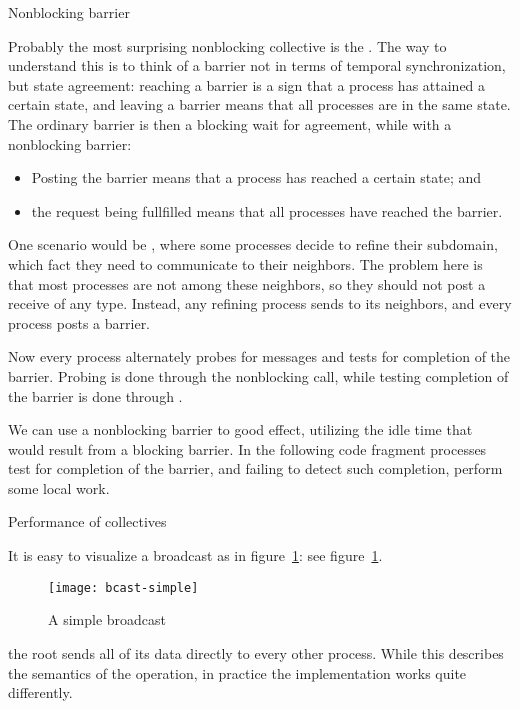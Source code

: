  {Nonblocking barrier}
\label{sec:ibarrier}

Probably the most surprising nonblocking collective is the
. The way to understand this is to think of
a barrier not in terms of temporal synchronization, but state
agreement: reaching a barrier is a sign that a process has attained a
certain state, and leaving a barrier means that all processes are in
the same state. The ordinary barrier is then a blocking wait for
agreement, while with a nonblocking barrier:
\begin{itemize}
\item Posting the barrier means that a process has reached a certain
  state; and
\item the request being fullfilled means that all processes have
  reached the barrier.
\end{itemize}

One scenario would be , where
some processes decide to refine their subdomain, which
fact they need to communicate to their neighbors.
The problem here is that most processes are not among these neighbors,
so they should not post a receive of any type.
Instead, any refining process sends to its neighbors,
and every process posts a barrier.


Now every process alternately probes for messages
and tests for completion of the barrier.
Probing is done through the nonblocking  call,
while testing completion of the barrier is done through
.


We can use a nonblocking barrier to good effect, utilizing the idle
time that would result from a blocking barrier. In the following code
fragment processes test for completion of the barrier, and failing to
detect such completion, perform some local work.


 {Performance of collectives}
\label{sec:collect-perform}

It is easy to visualize a broadcast as in figure~\ref{fig:bcast-simple}:
see figure~\ref{fig:bcast-simple}.
\begin{figure}[ht]
  \texttt{[image: bcast-simple]}
  \caption{A simple broadcast}
  \label{fig:bcast-simple}
\end{figure}
the root sends all of its data directly to every other process.
While this describes the semantics of the operation, in practice
the implementation works quite differently.

